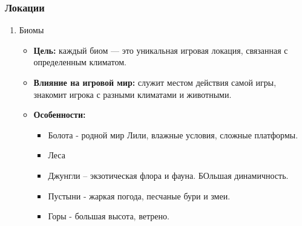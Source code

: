 \documentclass{article}
\begin{document}
\subsubsection{Локации}
\begin{enumerate}
    \item Биомы
    \begin{itemize}
     \item \textbf{Цель:} каждый биом — это уникальная игровая локация, связанная с определенным климатом.
     \item \textbf{Влияние на игровой мир:} служит местом действия самой игры, знакомит игрока с разными климатами и животными.
     \item \textbf{Особенности:}
        \begin{itemize}
            \item Болота - родной мир Лили, влажные условия, сложные платформы. 
            \item Леса
            \item Джунгли – экзотическая флора и фауна. БОльшая динамичность.
            \item Пустыни - жаркая погода, песчаные бури и змеи.
            \item Горы - большая высота, ветрено.
            
        \end{itemize}
    \end{itemize}
    

\end{enumerate}
\end{document}
